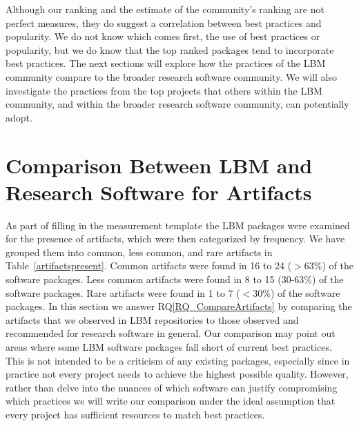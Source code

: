 \documentclass[final, 3p, times, authoryear]{elsarticle}
\newcommand{\rqref}[1]{RQ\ref{#1}}
\begin{document}
Although our ranking and the estimate of the community's ranking are not perfect
measures, they do suggest a correlation between best practices and popularity.
We do not know which comes first, the use of best practices or popularity, but
we do know that the top ranked packages tend to incorporate best practices.  The
next sections will explore how the practices of the LBM community compare to the
broader research software community.  We will also investigate the practices
from the top projects that others within the LBM community, and within the
broader research software community, can potentially adopt.

\section{Comparison Between LBM and Research Software for Artifacts}
\label{Sec_CompareArtifacts}

As part of filling in the measurement template the LBM packages were examined
for the presence of artifacts, which were then categorized by frequency. We have
grouped them into common, less common, and rare artifacts in
Table~\ref{artifactspresent}. Common artifacts were found in 16 to 24 ($>$63\%)
of the software packages. Less common artifacts were found in 8 to 15 (30-63\%)
of the software packages. Rare artifacts were found in 1 to 7 ($<$30\%) of the
software packages.  In this section we answer \rqref{RQ_CompareArtifacts} by
comparing the artifacts that we observed in LBM repositories to those observed
and recommended for research software in general. Our comparison may point out
areas where some LBM software packages fall short of current best practices.
This is not intended to be a criticism of any existing packages, especially
since in practice not every project needs to achieve the highest possible
quality.  However, rather than delve into the nuances of which software can
justify compromising which practices we will write our comparison under the
ideal assumption that every project has sufficient resources to match best
practices.
\end{document}
